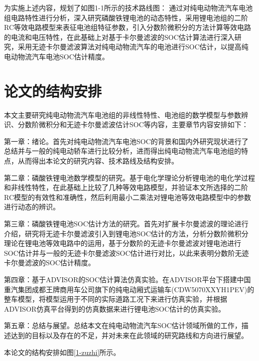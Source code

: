 为实施上述内容，规划了如图1-1所示的技术路线图：
通过对纯电动物流汽车电池组电路特性进行分析，深入研究磷酸铁锂电池的动态特性，采用锂电池组的二阶RC等效电路模型来表征电池组特征参数，引入分数阶微积分的方法计算等效电路的电流和电压特性，在此基础上对基于卡尔曼滤波的SOC估计算法进行深入研究，采用无迹卡尔曼滤波算法对纯电动物流汽车的电池进行SOC估计，以提高纯电动物流汽车电池SOC估计精度。
\section{论文的结构安排}
本文主要研究纯电动物流汽车电池组的非线性特性、电池组的数学模型与参数辨识、分数阶微积分和无迹卡尔曼滤波估计SOC等内容，主要章节内容安排如下：

第一章：绪论。首先对纯电动物流汽车电池SOC的背景和国内外研究现状进行了总结并与一般的纯电动轿车进行比较分析，进而得出纯电动物流汽车电池组的特点，从而得出本论文的研究内容、技术路线及结构安排。

第二章：磷酸铁锂电池数学模型的研究。基于电化学理论分析锂电池的电化学过程和非线性特性，在此基础上比较了几种等效电路模型，并验证本文所选择的二阶RC模型的有效性和准确性，然后利用最小二乘法对锂电池等效电路模型中的参数进行动态的辨识。

第三章：磷酸铁锂电池SOC估计方法的研究。首先对扩展卡尔曼滤波的理论进行介绍，研究将无迹卡尔曼滤波引入到锂电池SOC估计的方法，分析分数阶微积分理论在锂电池等效电路中的运用，基于分数阶的无迹卡尔曼滤波对锂电池进行SOC估计并与一般的无迹卡尔曼滤波SOC估计进行对比，以此来表明分数阶无迹卡尔曼滤波的SOC估计精度。

第四章：基于ADVISOR的SOC估计算法仿真实验。在ADVISOR平台下搭建中国重汽集团成都王牌商用车公司旗下的纯电动厢式运输车(CDW5070XXYH1PEV)的整车模型，将模型运用于不同的实际道路工况下来进行仿真实验，并根据ADVISOR仿真平台得到的仿真数据来进行锂电池SOC估计的仿真实验。

第五章：总结与展望。总结本文在纯电动物流汽车SOC估计领域所做的工作，描述达到的目标以及存在的不足，并对未来在此领域的研究路线和方向进行展望。

本论文的结构安排如图\ref{1-zuzhi}所示。
	

	
	

